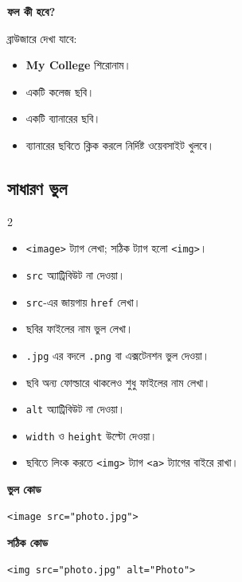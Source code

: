 \textbf{\color{chFourTeal}ফল কী হবে?}\par
ব্রাউজারে দেখা যাবে:
\begin{itemize}
\item \textbf{My College} শিরোনাম।
\item একটি কলেজ ছবি।
\item একটি ব্যানারের ছবি।
\item ব্যানারের ছবিতে ক্লিক করলে নির্দিষ্ট ওয়েবসাইট খুলবে।
\end{itemize}
\par\smallskip



\subsection{সাধারণ ভুল}

\begin{multicols}{2}
\small
\begin{itemize}
\item \texttt{<image>} ট্যাগ লেখা; সঠিক ট্যাগ হলো \texttt{<img>}।
\item \texttt{src} অ্যাট্রিবিউট না দেওয়া।
\item \texttt{src}-এর জায়গায় \texttt{href} লেখা।
\item ছবির ফাইলের নাম ভুল লেখা।
\item \texttt{.jpg} এর বদলে \texttt{.png} বা এক্সটেনশন ভুল দেওয়া।
\item ছবি অন্য ফোল্ডারে থাকলেও শুধু ফাইলের নাম লেখা।
\item \texttt{alt} অ্যাট্রিবিউট না দেওয়া।
\item \texttt{width} ও \texttt{height} উল্টো দেওয়া।
\item ছবিতে লিংক করতে \texttt{<img>} ট্যাগ \texttt{<a>} ট্যাগের বাইরে রাখা।
\end{itemize}
\end{multicols}


\noindent
\begin{minipage}[t]{.48\linewidth}\vspace{0pt}
\textbf{\color{chFourRose}ভুল কোড}\par
\begin{verbatim}
<image src="photo.jpg">
\end{verbatim}
\end{minipage}\hfill
\begin{minipage}[t]{.48\linewidth}\vspace{0pt}
\textbf{\color{chFourTeal}সঠিক কোড}\par
\begin{verbatim}
<img src="photo.jpg" alt="Photo">
\end{verbatim}
\end{minipage}

